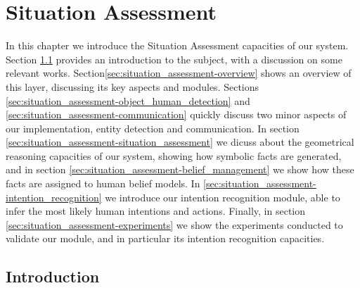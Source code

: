 
\chapter{Situation Assessment} %

\label{chap-situation_assessment} %


In this chapter we introduce the Situation Assessment capacities of our system. Section \ref{sec:situation_assessment-intro} provides an introduction to the subject, with a discussion on some relevant works. Section\ref{sec:situation_assessment-overview} shows an overview of this layer, discussing its key aspects and modules. Sections \ref{sec:situation_assessment-object_human_detection} and \ref{sec:situation_assessment-communication} quickly discuss two minor aspects of our implementation, entity detection and communication. In section \ref{sec:situation_assessment-situation_assessment} we dicuss about the geometrical reasoning capacities of our system, showing how symbolic facts are generated, and in section \ref{sec:situation_assessment-belief_management} we show how these facts are assigned to human belief models. In \ref{sec:situation_assessment-intention_recognition} we introduce our intention recognition module, able to infer the most likely human intentions and actions. Finally, in section \ref{sec:situation_assessment-experiments} we show the experiments conducted to validate our module, and in particular its intention recognition capacities.

\section{Introduction}
\label{sec:situation_assessment-intro}
